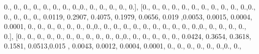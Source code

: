 \documentclass[
]{book}
\newenvironment{Shaded}{\begin{snugshade}}{\end{snugshade}}
\newcommand{\FloatTok}[1]{\textcolor[rgb]{0.00,0.00,0.81}{#1}}
\newcommand{\NormalTok}[1]{#1}
\begin{document}
\begin{Shaded}
\begin{Highlighting}[]
\FloatTok{0.}\NormalTok{, }\FloatTok{0.}\NormalTok{, }\FloatTok{0.}\NormalTok{, }\FloatTok{0.}\NormalTok{, }\FloatTok{0.}\NormalTok{, }\FloatTok{0.}\NormalTok{, }\FloatTok{0.}\NormalTok{, }\FloatTok{0.}\NormalTok{,}\FloatTok{0.}\NormalTok{, }\FloatTok{0.}\NormalTok{, }\FloatTok{0.}\NormalTok{, }\FloatTok{0.}\NormalTok{, }\FloatTok{0.}\NormalTok{, }\FloatTok{0.}\NormalTok{], [}\FloatTok{0.}\NormalTok{, }\FloatTok{0.}\NormalTok{, }\FloatTok{0.}\NormalTok{, }\FloatTok{0.}\NormalTok{, }\FloatTok{0.}\NormalTok{, }\FloatTok{0.}\NormalTok{,}
\FloatTok{0.}\NormalTok{, }\FloatTok{0.}\NormalTok{, }\FloatTok{0.}\NormalTok{, }\FloatTok{0.}\NormalTok{, }\FloatTok{0.}\NormalTok{,}\FloatTok{0.}\NormalTok{, }\FloatTok{0.}\NormalTok{, }\FloatTok{0.}\NormalTok{, }\FloatTok{0.}\NormalTok{, }\FloatTok{0.}\NormalTok{, }\FloatTok{0.0119}\NormalTok{, }\FloatTok{0.2907}\NormalTok{, }\FloatTok{0.4075}\NormalTok{, }\FloatTok{0.1979}\NormalTok{, }\FloatTok{0.0656}\NormalTok{,}
\FloatTok{0.019}\NormalTok{ ,}\FloatTok{0.0053}\NormalTok{, }\FloatTok{0.0015}\NormalTok{, }\FloatTok{0.0004}\NormalTok{, }\FloatTok{0.0001}\NormalTok{, }\FloatTok{0.}\NormalTok{, }\FloatTok{0.}\NormalTok{, }\FloatTok{0.}\NormalTok{, }\FloatTok{0.}\NormalTok{, }\FloatTok{0.}\NormalTok{, }\FloatTok{0.}\NormalTok{, }\FloatTok{0.}\NormalTok{,}\FloatTok{0.}\NormalTok{, }\FloatTok{0.}\NormalTok{, }\FloatTok{0.}\NormalTok{,}
\FloatTok{0.}\NormalTok{, }\FloatTok{0.}\NormalTok{, }\FloatTok{0.}\NormalTok{, }\FloatTok{0.}\NormalTok{, }\FloatTok{0.}\NormalTok{, }\FloatTok{0.}\NormalTok{, }\FloatTok{0.}\NormalTok{, }\FloatTok{0.}\NormalTok{,}\FloatTok{0.}\NormalTok{, }\FloatTok{0.}\NormalTok{, }\FloatTok{0.}\NormalTok{, }\FloatTok{0.}\NormalTok{, }\FloatTok{0.}\NormalTok{, }\FloatTok{0.}\NormalTok{], [}\FloatTok{0.}\NormalTok{, }\FloatTok{0.}\NormalTok{, }\FloatTok{0.}\NormalTok{, }\FloatTok{0.}\NormalTok{, }\FloatTok{0.}\NormalTok{, }\FloatTok{0.}\NormalTok{,}
\FloatTok{0.}\NormalTok{, }\FloatTok{0.}\NormalTok{, }\FloatTok{0.}\NormalTok{, }\FloatTok{0.}\NormalTok{, }\FloatTok{0.}\NormalTok{,}\FloatTok{0.}\NormalTok{, }\FloatTok{0.}\NormalTok{, }\FloatTok{0.}\NormalTok{, }\FloatTok{0.}\NormalTok{, }\FloatTok{0.}\NormalTok{, }\FloatTok{0.}\NormalTok{, }\FloatTok{0.0424}\NormalTok{, }\FloatTok{0.3654}\NormalTok{, }\FloatTok{0.3618}\NormalTok{, }\FloatTok{0.1581}\NormalTok{,}
\FloatTok{0.0513}\NormalTok{,}\FloatTok{0.015}\NormalTok{ , }\FloatTok{0.0043}\NormalTok{, }\FloatTok{0.0012}\NormalTok{, }\FloatTok{0.0004}\NormalTok{, }\FloatTok{0.0001}\NormalTok{, }\FloatTok{0.}\NormalTok{, }\FloatTok{0.}\NormalTok{, }\FloatTok{0.}\NormalTok{, }\FloatTok{0.}\NormalTok{, }\FloatTok{0.}\NormalTok{, }\FloatTok{0.}\NormalTok{,}\FloatTok{0.}\NormalTok{, }\FloatTok{0.}\NormalTok{,}

\end{Highlighting}
\end{Shaded}
\end{document}
